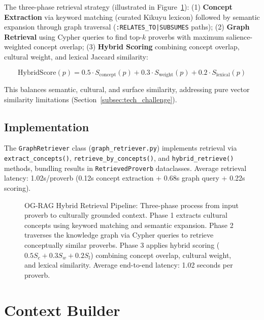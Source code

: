 The three-phase retrieval strategy (illustrated in Figure~\ref{fig:retrieval_pipeline}): (1) \textbf{Concept Extraction} via keyword matching (curated Kikuyu lexicon) followed by semantic expansion through graph traversal (\texttt{:RELATES\_TO|SUBSUMES} paths); (2) \textbf{Graph Retrieval} using Cypher queries to find top-$k$ proverbs with maximum salience-weighted concept overlap; (3) \textbf{Hybrid Scoring} combining concept overlap, cultural weight, and lexical Jaccard similarity:

\begin{equation}
\text{HybridScore}(p) = 0.5 \cdot S_{\text{concept}}(p) + 0.3 \cdot S_{\text{weight}}(p) + 0.2 \cdot S_{\text{lexical}}(p)
\end{equation}

This balances semantic, cultural, and surface similarity, addressing pure vector similarity limitations (Section~\ref{subsec:tech_challenge}).

\subsection{Implementation}
\label{subsec:graph_retriever_impl}

The \texttt{GraphRetriever} class (\texttt{graph\_retriever.py}) implements retrieval via \texttt{extract\_concepts()}, \texttt{retrieve\_by\_concepts()}, and \texttt{hybrid\_retrieve()} methods, bundling results in \texttt{RetrievedProverb} dataclasses. Average retrieval latency: 1.02s/proverb (0.12s concept extraction + 0.68s graph query + 0.22s scoring).

\begin{figure}[htbp]
\centering
\resizebox{0.75\textwidth}{!}{}
\caption{OG-RAG Hybrid Retrieval Pipeline: Three-phase process from input proverb to culturally grounded context. Phase 1 extracts cultural concepts using keyword matching and semantic expansion. Phase 2 traverses the knowledge graph via Cypher queries to retrieve conceptually similar proverbs. Phase 3 applies hybrid scoring ($0.5S_c + 0.3S_w + 0.2S_l$) combining concept overlap, cultural weight, and lexical similarity. Average end-to-end latency: 1.02 seconds per proverb.}
\label{fig:retrieval_pipeline}
\end{figure}

\section{Context Builder}
\label{sec:context_builder}

